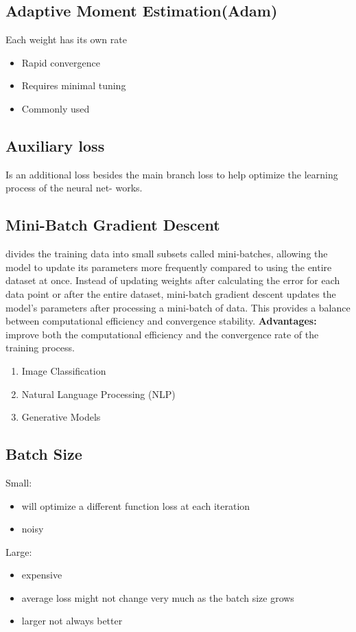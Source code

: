\documentclass[11pt, english]{article}
\begin{document}
\subsection{Adaptive Moment Estimation(Adam)}
Each weight has its own rate
\begin{itemize}
    \item Rapid convergence
    \item Requires minimal tuning
    \item Commonly used
\end{itemize}
\subsection{Auxiliary loss}
Is an additional loss besides the main branch loss to help optimize the learning process of the neural net- works. 
\subsection{Mini-Batch Gradient Descent}
 divides the training data into small subsets called mini-batches, allowing the model to update its parameters more frequently compared to using the entire dataset at once.
Instead of updating weights after calculating the error for each data point  or after the entire dataset, mini-batch gradient descent updates the model’s parameters after processing a mini-batch of data. This provides a balance between computational efficiency and convergence stability.
\textbf{Advantages: }improve both the computational efficiency and the convergence rate of the training process.
\begin{enumerate}
    \item Image Classification
    \item Natural Language Processing (NLP)
    \item Generative Models
\end{enumerate}
\subsection{Batch Size}
Small: 
\begin{itemize}
    \item will optimize a different function loss at each iteration
    \item noisy
\end{itemize}
Large:
\begin{itemize}
    \item expensive
    \item average loss might not change very much as the batch size grows
    \item larger not always better
\end{itemize}
\end{document}
